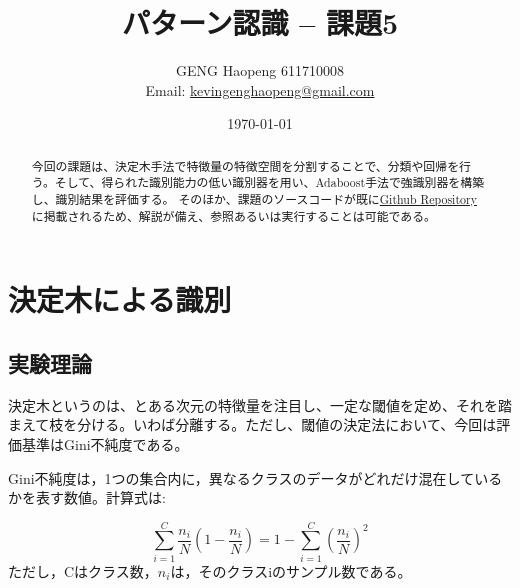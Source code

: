 \documentclass[ %
  uplatex,%
  papersize%
]{jsarticle}
\title{パターン認識 -- 課題5}
\author{\large GENG Haopeng 611710008 \\ \small Email:  \href{mailto:kevingenghaopeng@gmail.com}{kevingenghaopeng@gmail.com}}
\affil{\small Department of Intelligent Systems, Nagoya University}
\date{\today}
\begin{document}
\maketitle

\begin{abstract}
今回の課題は、決定木手法で特徴量の特徴空間を分割することで、分類や回帰を行う。そして、得られた識別能力の低い識別器を用い、Adaboost手法で強識別器を構築し、識別結果を評価する。
そのほか、課題のソースコードが既に\href{https://github.com/Secondtonumb/pattern_recogn/tree/master/pattern04}{Github Repository}に掲載されるため、解説が備え、参照あるいは実行することは可能である。
\end{abstract}

\section{決定木による識別}
\subsection{実験理論}
決定木というのは、とある次元の特徴量を注目し、一定な閾値を定め、それを踏まえて枝を分ける。いわば分離する。ただし、閾値の決定法において、今回は評価基準はGini不純度である。

Gini不純度は，1つの集合内に，異なるクラスのデータがどれだけ混在しているかを表す数値。計算式は:

$$\sum_{i=1}^{C}\frac{n_{i}}{N}(1-\frac{n_{i}}{N})=1 - \sum_{i=1}^{C}(\frac{n_{i}}{N})^2$$
ただし，Cはクラス数，$n_{i}$は，そのクラスiのサンプル数である。
\end{document}
